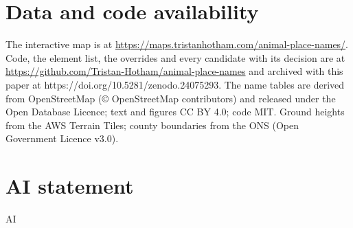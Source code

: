 \documentclass[11pt,a4paper]{article}
\begin{document}
\section*{Data and code availability}
The interactive map is at \url{https://maps.tristanhotham.com/animal-place-names/}. Code, the element list, the overrides and every candidate with its decision are at \url{https://github.com/Tristan-Hotham/animal-place-names} and archived with this paper at https://doi.org/10.5281/zenodo.24075293. The name tables are derived from OpenStreetMap (\copyright{} OpenStreetMap contributors) and released under the Open Database Licence; text and figures CC BY 4.0; code MIT. Ground heights from the AWS Terrain Tiles; county boundaries from the ONS (Open Government Licence v3.0).

\section*{AI statement}
{{AI}}
\end{document}
